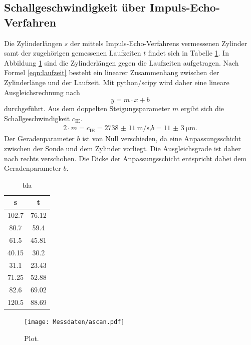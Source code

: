 \subsection{Schallgeschwindigkeit über Impuls-Echo-Verfahren}
Die Zylinderlängen $s$ der mittels Impuls-Echo-Verfahrens vermessenen Zylinder samt der zugehörigen gemessenen Laufzeiten $t$ findet sich in Tabelle \ref{tab:iev}. In Abbildung \ref{fig:iev} sind die Zylinderlängen gegen die Laufzeiten aufgetragen. Nach Formel \eqref{eqn:laufzeit} besteht ein linearer Zusammenhang zwischen der Zylinderlänge und der Laufzeit.
Mit python/scipy \cite{scipy} wird daher eine lineare Ausgleichsrechnung nach
\begin{equation}
  y=m\cdot x +b
\end{equation}
durchgeführt.
Aus dem doppelten Steigungsparameter $m$ ergibt sich die Schallgeschwindigkeit $c_\mathrm{IE}$.
\begin{gather*}
2 \cdot m=c_\mathrm{IE}=  \SI{2738(11)}{\meter\per\second} \text{,}
b=  \SI{11(3)}{\micro\meter} \text{.}
\end{gather*}
Der Geradenparameter $b$ ist von Null verschieden, da eine Anpassungsschicht zwischen der Sonde und dem Zylinder vorliegt. Die Ausgleichsgrade ist daher nach rechts verschoben. Die Dicke der Anpassungsschicht entspricht dabei dem Geradenparameter $b$.
\begin{table}
  \centering
  \caption{bla}
  \label{tab:iev}
  \begin{tabular}{cc}
    \toprule
    s & t \\
    \midrule
    102.7 & 76.12 \\
    80.7 & 59.4 \\
    61.5 & 45.81 \\
    40.15 & 30.2 \\
    31.1 & 23.43 \\
    71.25 & 52.88 \\
    82.6 & 69.02 \\
    120.5 & 88.69 \\
    \bottomrule
  \end{tabular}
\end{table}

\begin{figure}
  \centering
  \texttt{[image: Messdaten/ascan.pdf]}
  \caption{Plot.}
  \label{fig:iev}
\end{figure}
\FloatBarrier

